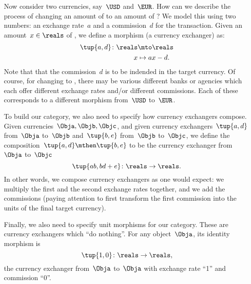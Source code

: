 Now consider two currencies, say~$\USD$ and~$\EUR$.
How can we describe the process of changing an amount of \USD to an amount of \EUR?
We model this using two numbers: an exchange rate~$a$ and a commission~$d$ for the transaction.
Given an amount~$x \in \reals$ of \USD, we define a morphism (a currency exchanger) as:
\begin{equation*}
	\label{eq:def_curr_ex}
	\begin{aligned}
		\tup{a,d}\colon \reals & \mto \reals     \\
		x                      & \mapsto ax - d.
	\end{aligned}
\end{equation*}
Note that that the commission~$d$ is to be indended in the target currency.
Of course, for changing \USD to \EUR, there may be various different banks or agencies which each offer different exchange rates and/or different commissions.
Each of these corresponds to a different morphism from~$\USD$ to~$\EUR$.

To build our category, we also need to specify how currency exchangers compose.
Given currencies~$\Obja, \Objb, \Objc$, and given currency exchangers~$\tup{a,d}$ from~$\Obja$ to~$\Objb$ and~$\tup{b,e}$ from~$\Objb$ to~$\Objc$,
we define the composition~$\tup{a,d} \mthen \tup{b,e}$ to be the currency exchanger from~$\Obja$ to~$\Objc$
\begin{equation}
	\label{eq:comp-law-curr}
	\tup{ab,bd+e} \colon \reals \to \reals.
\end{equation}
In other words, we compose currency exchangers as one would expect: we multiply the first and the second exchange rates together, and we add the commissions (paying attention to first transform the first commission into the units of the final target currency).

Finally, we also need to specify unit morphisms for our category.
These are currency exchangers which ``do nothing''.
For any object~$\Obja$, its identity morphism is
\begin{equation*}
	\tup{1,0} \colon \reals \to \reals,
\end{equation*}
the currency exchanger from~$\Obja$ to~$\Obja$ with exchange rate ``1'' and commission ``0''.

